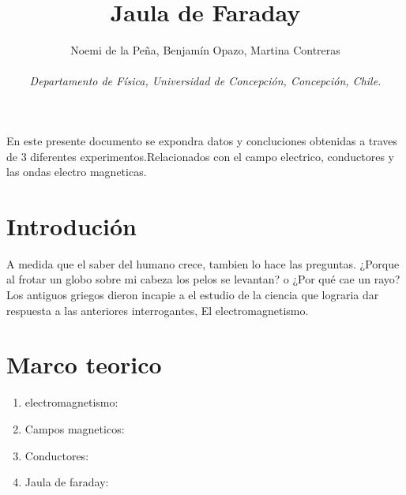 \documentclass[a4paper,12pt]{article}
\title{Jaula de Faraday}
\author{Noemi de la Peña, Benjamín Opazo, Martina Contreras \\ \\
 \textit{ Departamento de Física, Universidad de Concepción, Concepción, Chile. }}
\date{}
\begin{document}
\maketitle 



En este presente documento se expondra datos y concluciones 
obtenidas a traves de 3 diferentes experimentos.Relacionados con el campo electrico,
conductores y las ondas electro magneticas.



\section*{Introdución}
    A medida que el saber del humano crece, tambien lo hace las preguntas.
    ¿Porque al frotar un globo sobre mi cabeza los pelos se levantan? o 
    ¿Por qué cae un rayo?
    Los antiguos griegos dieron incapie a el estudio de la ciencia que 
    lograria dar respuesta a las anteriores interrogantes, El electromagnetismo.
\section*{Marco teorico}
\begin{enumerate}
    \item electromagnetismo:
    \item Campos magneticos:
    \item Conductores:
    \item Jaula de faraday:
\end{enumerate}

   






\end{document}
